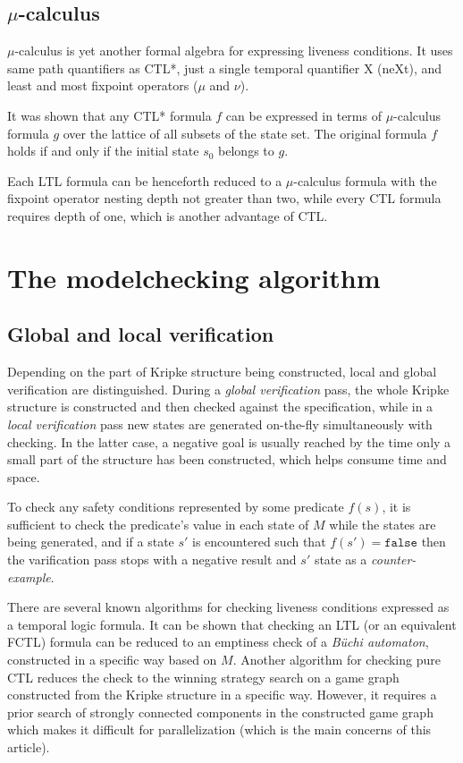 \documentclass[a4paper,notitlepage,14pt]{article}
\begin{document}
\subsection{$\mu$-calculus}
\label{sec:mu-calculus}

$\mu$-calculus is yet another formal algebra for expressing liveness conditions. It uses
same path quantifiers as CTL*, just a single temporal quantifier X (neXt), and least and
most fixpoint operators ($\mu$ and $\nu$).

It was shown that any CTL* formula $f$ can be expressed in terms of $\mu$-calculus formula
$g$ over the lattice of all subsets of the state set. The original formula $f$ holds if
and only if the initial state $s_0$ belongs to $g$.

Each LTL formula can be henceforth reduced to a $\mu$-calculus formula with the fixpoint
operator nesting depth not greater than two, while every CTL formula requires depth of
one, which is another advantage of CTL.

\section{The modelchecking algorithm}
\label{sec:modelch-algor}

\subsection{Global and local verification}
\label{sec:glob-local-verif}

Depending on the part of Kripke structure being
constructed, local and global verification are distinguished. During a \emph{global verification}
pass, the whole Kripke structure is constructed and then checked against the
specification, while in a \emph{local verification} pass new states are generated on-the-fly
simultaneously with checking. In the latter case, a negative goal is usually reached by
the time only a small part of the structure has been constructed, which helps consume time and
space.

To check any safety conditions represented by some predicate $f(s)$, it is sufficient to
check the predicate's value in each state of $M$ while the states are being generated, and
if a state $s'$ is encountered such that $f(s') = \mathtt{false}$ then the varification
pass stops with a negative result and $s'$ state as a \emph{counter-example}.

There are several known algorithms for checking liveness conditions expressed as a
temporal logic formula. It can be shown that checking an LTL (or an equivalent
FCTL) formula can be reduced to an emptiness check of a \emph{B\"{u}chi automaton}, constructed in a
specific way based on $M$. Another algorithm for checking pure CTL reduces the check to
the winning strategy search on a game graph constructed from the Kripke structure in a
specific way. However, it requires a prior search of strongly connected components in the
constructed game graph which makes it difficult for parallelization (which is the main
concerns of this article).
\end{document}
